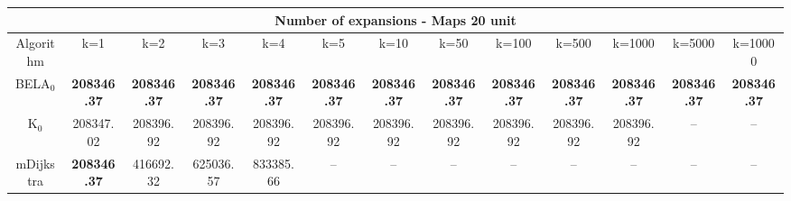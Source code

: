 \begin{tabular}{c|cccccccccccc}\toprule
\multicolumn{13}{c}{Number of expansions - Maps 20 unit}\\ \midrule
Algorithm & k=1 & k=2 & k=3 & k=4 & k=5 & k=10 & k=50 & k=100 & k=500 & k=1000 & k=5000 & k=10000 \\ \midrule
BELA$_0$ & \textbf{208346.37} & \textbf{208346.37} & \textbf{208346.37} & \textbf{208346.37} & \textbf{208346.37} & \textbf{208346.37} & \textbf{208346.37} & \textbf{208346.37} & \textbf{208346.37} & \textbf{208346.37} & \textbf{208346.37} & \textbf{208346.37} \\
K$_0$ & 208347.02 & 208396.92 & 208396.92 & 208396.92 & 208396.92 & 208396.92 & 208396.92 & 208396.92 & 208396.92 & 208396.92 & -- & -- \\
mDijkstra & \textbf{208346.37} & 416692.32 & 625036.57 & 833385.66 & -- & -- & -- & -- & -- & -- & -- & -- \\ \bottomrule 
\end{tabular}
